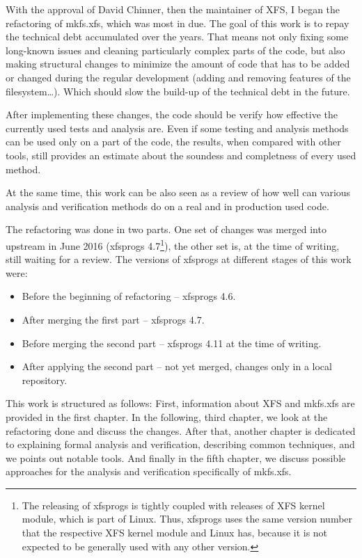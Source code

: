 With the approval of David Chinner, then the maintainer of XFS, I began the
refactoring of mkfs.xfs, which was most in due. The goal of this work is to
repay the technical debt accumulated over the years. That means not only
fixing some long-known issues and cleaning particularly complex parts of
the code, but also making structural changes to minimize the amount of code
that has to be added or changed during the regular development (adding and
removing features of the filesystem\ldots). Which should slow the build-up
of the technical debt in the future.

After implementing these changes, the code should be verify how effective
the currently used tests and analysis are. Even if some testing and
analysis methods can be used only on a part of the code, the results, when
compared with other tools, still provides an estimate about the soundess
and completness of every used method.

At the same time, this work can be also seen as a review of how well can
various analysis and verification methods do on a real and in production
used code.

The refactoring was done in two parts. One set of changes was merged into
upstream in June 2016 (xfsprogs 4.7\footnote{The releasing of xfsprogs is
		tightly coupled with releases of XFS kernel module, which
		is part of Linux. Thus, xfsprogs uses the same version
		number that the respective XFS kernel module and Linux has,
because it is not expected to be generally used with any other version.}),
the other set is, at the time of writing, still waiting for a review. The
versions of xfsprogs at different stages of this work were:
\begin{itemize}
\item Before the beginning of refactoring -- xfsprogs 4.6.
\item After merging the first part -- xfsprogs 4.7.
\item Before merging the second part -- xfsprogs 4.11 at the time of writing.
\item After applying the second part -- not yet merged, changes only in a local repository.
\end{itemize}

This work is structured as follows: First, information about XFS and
mkfs.xfs are provided in the first chapter. In the following, third chapter, we look
at the refactoring done and discuss the changes. After that, another
chapter is dedicated to explaining formal analysis and verification,
describing common techniques, and we points out notable tools. And finally
in the fifth chapter, we discuss possible approaches for the analysis and
verification specifically of mkfs.xfs.

